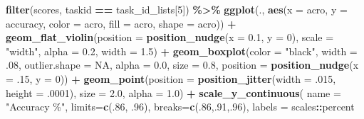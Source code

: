 \documentclass[
]{book}
\newenvironment{Shaded}{\begin{snugshade}}{\end{snugshade}}
\newcommand{\AttributeTok}[1]{\textcolor[rgb]{0.13,0.29,0.53}{#1}}
\newcommand{\ConstantTok}[1]{\textcolor[rgb]{0.56,0.35,0.01}{#1}}
\newcommand{\DecValTok}[1]{\textcolor[rgb]{0.00,0.00,0.81}{#1}}
\newcommand{\FloatTok}[1]{\textcolor[rgb]{0.00,0.00,0.81}{#1}}
\newcommand{\FunctionTok}[1]{\textcolor[rgb]{0.13,0.29,0.53}{\textbf{#1}}}
\newcommand{\NormalTok}[1]{#1}
\newcommand{\SpecialCharTok}[1]{\textcolor[rgb]{0.81,0.36,0.00}{\textbf{#1}}}
\newcommand{\StringTok}[1]{\textcolor[rgb]{0.31,0.60,0.02}{#1}}
\begin{document}
\begin{Shaded}
\begin{Highlighting}[]
\FunctionTok{filter}\NormalTok{(scores, taskid }\SpecialCharTok{==}\NormalTok{ task\_id\_lists[}\DecValTok{5}\NormalTok{]) }\SpecialCharTok{\%\textgreater{}\%}
  \FunctionTok{ggplot}\NormalTok{(., }\FunctionTok{aes}\NormalTok{(}\AttributeTok{x =}\NormalTok{ acro, }\AttributeTok{y =}\NormalTok{ accuracy, }\AttributeTok{color =}\NormalTok{ acro,}
                \AttributeTok{fill =}\NormalTok{ acro, }\AttributeTok{shape =}\NormalTok{ acro)) }\SpecialCharTok{+}
  \FunctionTok{geom\_flat\_violin}\NormalTok{(}\AttributeTok{position =} \FunctionTok{position\_nudge}\NormalTok{(}\AttributeTok{x =} \FloatTok{0.1}\NormalTok{, }\AttributeTok{y =} \DecValTok{0}\NormalTok{),}
                   \AttributeTok{scale =} \StringTok{"width"}\NormalTok{, }\AttributeTok{alpha =} \FloatTok{0.2}\NormalTok{, }\AttributeTok{width =} \FloatTok{1.5}\NormalTok{) }\SpecialCharTok{+}
  \FunctionTok{geom\_boxplot}\NormalTok{(}\AttributeTok{color =} \StringTok{"black"}\NormalTok{, }\AttributeTok{width =}\NormalTok{ .}\DecValTok{08}\NormalTok{, }\AttributeTok{outlier.shape =} \ConstantTok{NA}\NormalTok{, }\AttributeTok{alpha =} \FloatTok{0.0}\NormalTok{,}
               \AttributeTok{size =} \FloatTok{0.8}\NormalTok{, }\AttributeTok{position =} \FunctionTok{position\_nudge}\NormalTok{(}\AttributeTok{x =}\NormalTok{ .}\DecValTok{15}\NormalTok{, }\AttributeTok{y =} \DecValTok{0}\NormalTok{)) }\SpecialCharTok{+}
  \FunctionTok{geom\_point}\NormalTok{(}\AttributeTok{position =} \FunctionTok{position\_jitter}\NormalTok{(}\AttributeTok{width =}\NormalTok{ .}\DecValTok{015}\NormalTok{, }\AttributeTok{height =}\NormalTok{ .}\DecValTok{0001}\NormalTok{),}
             \AttributeTok{size =} \FloatTok{2.0}\NormalTok{, }\AttributeTok{alpha =} \FloatTok{1.0}\NormalTok{) }\SpecialCharTok{+}
  \FunctionTok{scale\_y\_continuous}\NormalTok{(}
    \AttributeTok{name =} \StringTok{"Accuracy \%"}\NormalTok{,}
    \AttributeTok{limits=}\FunctionTok{c}\NormalTok{(.}\DecValTok{86}\NormalTok{, .}\DecValTok{96}\NormalTok{),}
    \AttributeTok{breaks=}\FunctionTok{c}\NormalTok{(.}\DecValTok{86}\NormalTok{,.}\DecValTok{91}\NormalTok{,.}\DecValTok{96}\NormalTok{),}
    \AttributeTok{labels =}\NormalTok{ scales}\SpecialCharTok{::}\NormalTok{percent}


\end{Highlighting}
\end{Shaded}
\end{document}
